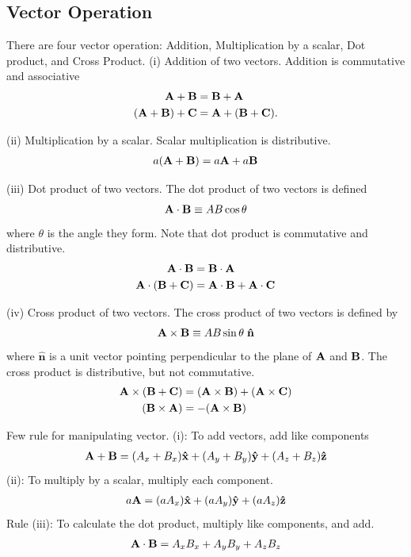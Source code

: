 \documentclass[../main.tex]{subfiles}
\begin{document}
\subsection*{Vector Operation}
There are four vector operation: Addition,  Multiplication by a scalar, Dot product, and Cross Product.
(i) Addition of two vectors. Addition is commutative and associative
\begin{align*}
    \mathbf{A}+\mathbf{B}&=\mathbf{B}+\mathbf{A}\\
    (\mathbf{A }+ \mathbf{B}) +\mathbf{ C}& = \mathbf{A }+ (\mathbf{B} + \mathbf{C}).
\end{align*}

(ii) Multiplication by a scalar. Scalar multiplication is distributive.
\begin{align*}
    a(\mathbf{A} + \mathbf{\mathbf{B}}) = a\mathbf{A} + a\mathbf{B}
\end{align*}

(iii) Dot product of two vectors. The dot product of two vectors is defined 
\begin{align*}
    \mathbf{A} \cdot \mathbf{B} \equiv AB \cos \theta
\end{align*}
where $\theta$ is the angle they form. Note that dot product is commutative and distributive.
\begin{align*}
    \mathbf{A} \cdot \mathbf{B} &= \mathbf{B} \cdot \mathbf{A}\\
    \mathbf{A} \cdot (\mathbf{B} + \mathbf{C}) &= \mathbf{A} \cdot \mathbf{B} + \mathbf{A} \cdot \mathbf{C}
\end{align*}

(iv) Cross product of two vectors. The cross product of two vectors is defined by
\begin{align*}
    \mathbf{A} \times \mathbf{B} \equiv AB \sin \theta\;\mathbf{ \hat{n}}
\end{align*}
where $\mathbf{\hat{n}}$ is a unit vector pointing perpendicular to the plane of $\mathbf{A}$ and $\mathbf{B}$.  The cross product is distributive, but not commutative.
\begin{align*}
    \mathbf{A} \times (\mathbf{B} + \mathbf{C}) &= (\mathbf{A} \times \mathbf{B}) + (\mathbf{A} \times \mathbf{C})\\
    (\mathbf{B} \times \mathbf{A}) &= -(\mathbf{A} \times \mathbf{B})
\end{align*}

Few rule for manipulating vector. (i): To add vectors, add like components
\begin{align*}
    \mathbf{A} + \mathbf{B}=(A_x + B_x )\mathbf{\hat{x}} + (A_y + B_y )\mathbf{\hat{y}} + (A_z + B_z )\mathbf{\hat{z}}
\end{align*}
(ii): To multiply by a scalar, multiply each component.
\begin{align*}
    a\mathbf{A} = (a A_x )\mathbf{\hat{x}}+ (a A_y )\mathbf{\hat{y}} + (a A_z )\mathbf{\hat{z}}
\end{align*}
Rule (iii): To calculate the dot product, multiply like components, and add.
\begin{align*}
    \mathbf{A} \cdot \mathbf{B} &= A_xB_x +A_yB_y+ A_zB_z \\
\end{align*}
\end{document}

